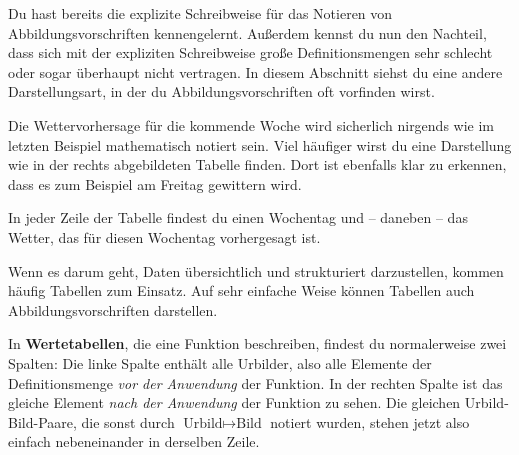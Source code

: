 \documentclass[../../main.tex]{subfiles}
\begin{document}
Du hast bereits die explizite Schreibweise für das Notieren von Abbildungsvorschriften kennengelernt. Außerdem kennst du nun den Nachteil, dass sich mit der expliziten Schreibweise große Definitionsmengen sehr schlecht oder sogar überhaupt nicht vertragen. In diesem Abschnitt siehst du eine andere Darstellungsart, in der du Abbildungsvorschriften oft vorfinden wirst.

\begin{example}{}
    
    Die Wettervorhersage für die kommende Woche wird sicherlich nirgends wie im letzten Beispiel mathematisch notiert sein. Viel häufiger wirst du eine Darstellung wie in der rechts abgebildeten Tabelle finden. Dort ist ebenfalls klar zu erkennen, dass es zum Beispiel am Freitag gewittern wird.
    
    In jeder Zeile der Tabelle findest du einen Wochentag und -- daneben -- das Wetter, das für diesen Wochentag vorhergesagt ist.
\end{example}

Wenn es darum geht, Daten übersichtlich und strukturiert darzustellen, kommen häufig Tabellen zum Einsatz. Auf sehr einfache Weise können Tabellen auch Abbildungsvorschriften darstellen.

In \textbf{Wertetabellen}, die eine Funktion beschreiben, findest du normalerweise zwei Spalten: Die linke Spalte enthält alle Urbilder, also alle Elemente der Definitionsmenge \emph{vor der Anwendung} der Funktion. In der rechten Spalte ist das gleiche Element \emph{nach der Anwendung} der Funktion zu sehen. Die gleichen Urbild-Bild-Paare, die sonst durch $\text{Urbild}\mapsto\text{Bild}$ notiert wurden, stehen jetzt also einfach nebeneinander in derselben Zeile.

\end{document}
